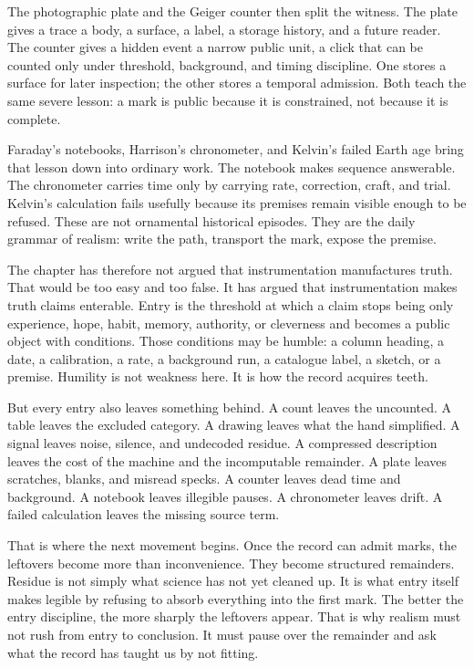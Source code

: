 \begin{movementclose}
The photographic plate and the Geiger counter then split the witness. The
plate gives a trace a body, a surface, a label, a storage history, and a future
reader. The counter gives a hidden event a narrow public unit, a click that can
be counted only under threshold, background, and timing discipline. One stores
a surface for later inspection; the other stores a temporal admission. Both
teach the same severe lesson: a mark is public because it is constrained, not
because it is complete.

Faraday's notebooks, Harrison's chronometer, and Kelvin's failed Earth age
bring that lesson down into ordinary work. The notebook makes sequence
answerable. The chronometer carries time only by carrying rate, correction,
craft, and trial. Kelvin's calculation fails usefully because its premises
remain visible enough to be refused. These are not ornamental historical
episodes. They are the daily grammar of realism: write the path, transport the
mark, expose the premise.

The chapter has therefore not argued that instrumentation manufactures truth.
That would be too easy and too false. It has argued that instrumentation makes
truth claims enterable. Entry is the threshold at which a claim stops being
only experience, hope, habit, memory, authority, or cleverness and becomes a
public object with conditions. Those conditions may be humble: a column heading,
a date, a calibration, a rate, a background run, a catalogue label, a sketch,
or a premise. Humility is not weakness here. It is how the record acquires
teeth.

But every entry also leaves something behind. A count leaves the uncounted.
A table leaves the excluded category. A drawing leaves what the hand simplified.
A signal leaves noise, silence, and undecoded residue. A compressed description
leaves the cost of the machine and the incomputable remainder. A plate leaves
scratches, blanks, and misread specks. A counter leaves dead time and
background. A notebook leaves illegible pauses. A chronometer leaves drift.
A failed calculation leaves the missing source term.

That is where the next movement begins. Once the record can admit marks, the
leftovers become more than inconvenience. They become structured remainders.
Residue is not simply what science has not yet cleaned up. It is what entry
itself makes legible by refusing to absorb everything into the first mark. The
better the entry discipline, the more sharply the leftovers appear. That is why
realism must not rush from entry to conclusion. It must pause over the remainder
and ask what the record has taught us by not fitting.


\end{movementclose}
